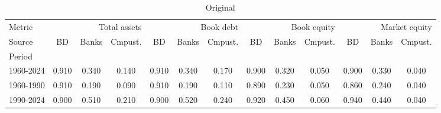 
    \begin{table}[htbp]
      \centering
      \caption{Original}
      \label{tab:Table 2}
      \small
      \begin{tabular}{lcccccccccccc}
\toprule
Metric & \multicolumn{3}{r}{Total assets} & \multicolumn{3}{r}{Book debt} & \multicolumn{3}{r}{Book equity} & \multicolumn{3}{r}{Market equity} \\
Source & BD & Banks & Cmpust. & BD & Banks & Cmpust. & BD & Banks & Cmpust. & BD & Banks & Cmpust. \\
Period &  &  &  &  &  &  &  &  &  &  &  &  \\
\midrule
1960-2024 & 0.910 & 0.340 & 0.140 & 0.910 & 0.340 & 0.170 & 0.900 & 0.320 & 0.050 & 0.900 & 0.330 & 0.040 \\
1960-1990 & 0.910 & 0.190 & 0.090 & 0.910 & 0.190 & 0.110 & 0.890 & 0.230 & 0.050 & 0.860 & 0.240 & 0.040 \\
1990-2024 & 0.900 & 0.510 & 0.210 & 0.900 & 0.520 & 0.240 & 0.920 & 0.450 & 0.060 & 0.940 & 0.440 & 0.040 \\
\bottomrule
\end{tabular}

    \end{table}
    